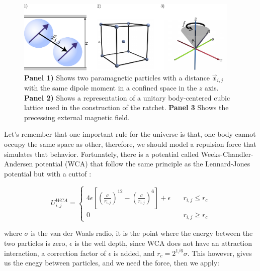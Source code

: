 \begin{figure}[H]
  \begin{center}
    \includegraphics[width=0.95\textwidth]{figures/methods1.pdf}
  \end{center}
  \caption[Representation of the paramagnetic colloids, body-centered-cubic lattice used for the ratchet, and the precessing conic magnetic field.]{\textbf{Panel 1)} Shows two paramagnetic particles with a distance \(\vec{x}_{i,j}\) with the same dipole moment in a confined space in the \( z\) axis. \textbf{Panel 2)} Shows a representation of a  unitary body-centered cubic lattice used in the construction of the ratchet. \textbf{Panel 3} Shows the precessing external magnetic field.}\label{fig:facecenteredlattice}
\end{figure}

Let's remember that one important rule for the universe is that, one body cannot occupy the same space as other, therefore, we should model a repulsion force that simulates that behavior. Fortunately, there is a potential called Weeks-Chandler-Andersen potential (WCA) that follow the same principle as the Lennard-Jones potential but with a cuttof \cite{hess1999augmented}:

\begin{equation}
  U_{i,j}^{WCA} = \begin{cases} 
    4\epsilon\left[ \left( \frac{\sigma}{r_{i,j}}\right)^{12} - \left( \frac{\sigma}{r_{i,j}}\right)^6\right] + \epsilon \quad &r_{i,j} \leq r_c \\
    0 \quad & r_{i,j} \geq r_c
  \end{cases}
  \label{eq:wcapotential}
\end{equation}

where $\sigma$ is the van der Waals radio, it is the point where the energy between the two particles is zero, $\epsilon$ is the well depth, since WCA does not have an attraction interaction, a correction factor of $\epsilon$ is added, and $r_c = 2^{1/6}\sigma$. This however, gives us the enegy between particles, and we need the force, then we apply:


